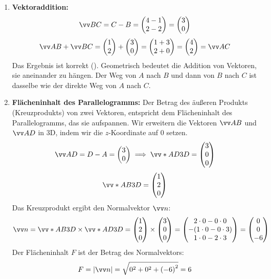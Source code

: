 \documentclass[ngerman]{scrreprt}
\newenvironment{loesungbox}[1]
  {\needspace{5\baselineskip}\begin{loesungboxstyle}[frametitle={#1}]}
  {\end{loesungboxstyle}}
\begin{document}
\begin{loesungbox}{Lösung zu \Cref{aufg:vektorrechnung}}
\begin{enumerate}
    \item \textbf{Vektoraddition:}
    \begin{equation*}
         \ivec{BC} = C - B = \icolTwo{4-1}{2-2} = \icolTwo{3}{0}
    \end{equation*}
    \begin{equation*}
         \ivec{AB} + \ivec{BC} = \icolTwo{1}{2} + \icolTwo{3}{0} = \icolTwo{1+3}{2+0} = \icolTwo{4}{2} = \ivec{AC}
    \end{equation*}
    Das Ergebnis ist korrekt (\wA). Geometrisch bedeutet die Addition von Vektoren, sie aneinander zu hängen. Der Weg von $A$ nach $B$ und dann von $B$ nach $C$ ist dasselbe wie der direkte Weg von $A$ nach $C$.

    \item \textbf{Flächeninhalt des Parallelogramms:}
    Der Betrag des äußeren Produkts (Kreuzprodukts) von zwei Vektoren, entspricht dem Flächeninhalt des Parallelogramms, das sie aufspannen. Wir erweitern die Vektoren $\ivec{AB}$ und $\ivec{AD}$ in 3D, indem wir die $z$-Koordinate auf $0$ setzen.
    \begin{equation*}
        \ivec{AD} = D - A = \icolTwo{3}{0} \implies \ivecS{AD}{\,3D} = \icolThree{3}{0}{0}
    \end{equation*}
    \begin{equation*}
        \ivecS{AB}{\,3D} = \icolThree{1}{2}{0}
    \end{equation*}
    Das Kreuzprodukt ergibt den Normalvektor $\ivec{n}$:
    \begin{equation*}
        \ivec{n} = \ivecS{AB}{\,3D} \times \ivecS{AD}{\,3D} = \icolThree{1}{2}{0} \times \icolThree{3}{0}{0} = \icolThree{2\cdot0 - 0\cdot0}{-(1\cdot0 - 0\cdot3)}{1\cdot0 - 2\cdot3} = \icolThree{0}{0}{-6}
    \end{equation*}
    Der Flächeninhalt $F$ ist der Betrag des Normalvektors:
    \begin{equation}
        F = |\ivec{n}| = \sqrt{0^2+0^2+{(-6)}^2} = 6
    \end{equation}
\end{enumerate}
\end{loesungbox}
\end{document}
